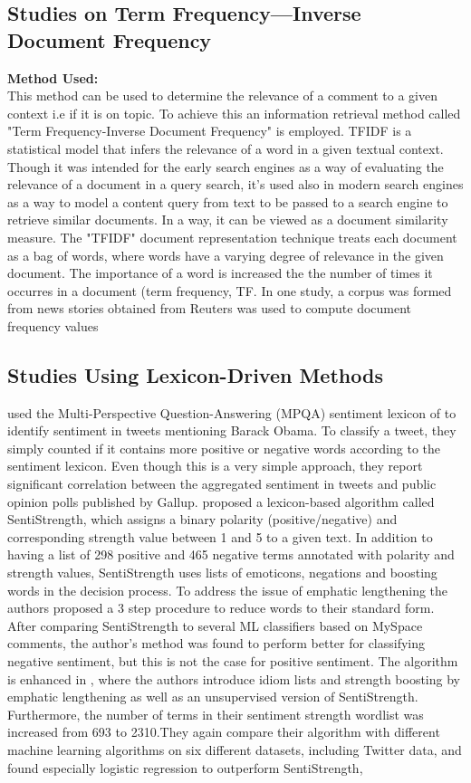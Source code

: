 \subsection{Studies on Term Frequency—Inverse Document Frequency}
\textbf{Method Used:}\\
This method can be used to determine the relevance of a comment to  a given context i.e if it is on topic. To achieve this an information retrieval method called "Term Frequency-Inverse Document Frequency" is employed.
TFIDF is a statistical model that infers the relevance of a word in a given textual context.
Though it was intended for the early search engines as a way of evaluating the relevance of a document in a query search, it's used also in modern search engines as a way to model a content query from text to be passed to a search engine to retrieve similar documents. In a way, it can be viewed as a document similarity measure. The "TFIDF" document representation technique treats each document as
a bag of words, where words have a varying degree of relevance  in the given document. The importance of a word is increased the the number of times it occurres in a document (term frequency, TF. In one study,  a corpus was formed from news stories obtained from Reuters was used to compute document frequency values


\subsection{Studies Using Lexicon-Driven Methods}
\cite{ref33} used the Multi-Perspective Question-Answering (MPQA) sentiment lexicon of \cite{ref34} to identify sentiment in tweets mentioning Barack Obama. To classify a tweet, they simply counted if it contains more positive or negative words according to the sentiment lexicon. Even though this is a very simple approach, they report significant correlation between the aggregated sentiment in tweets and public opinion polls published by Gallup. \cite{ref35} proposed a lexicon-based algorithm called SentiStrength, which assigns a binary polarity (positive/negative) and corresponding strength value between 1 and 5 to a given text. In addition to having a list of 298 positive and 465 negative terms annotated with polarity and strength values, SentiStrength uses lists of emoticons, negations and boosting words in the decision process. To address the issue of emphatic lengthening the authors proposed a 3 step procedure to reduce words to their standard form. After comparing SentiStrength to several ML classifiers based on MySpace comments, the author's method was found to perform better for classifying negative sentiment, but this is not the case for positive sentiment. The algorithm is enhanced in \cite{ref35}, where the authors introduce idiom lists and strength boosting by emphatic lengthening as well as an unsupervised version of SentiStrength. Furthermore, the number of terms in their sentiment strength wordlist was increased from 693 to 2310.They again compare their algorithm with different machine learning algorithms on six different datasets, including Twitter data, and found especially logistic regression to outperform SentiStrength, \cite{ref35}

